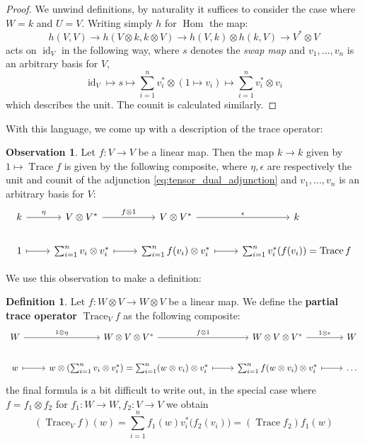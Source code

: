 \documentclass[12pt]{article}
\theoremstyle{plain}
\theoremstyle{definition}
\newtheorem{defn}[thm]{Definition} %
\newtheorem{observation}[thm]{Observation}
\newcommand{\lto}{\longrightarrow}
\begin{document}
\begin{proof}
We unwind definitions, by naturality it suffices to consider the case where $W = k$ and $U = V$. Writing simply $h$ for $\operatorname{Hom}$ the map:
\begin{equation}
h(V,V) \lto h(V \otimes k, k \otimes V) \lto h(V,k) \otimes h(k,V) \lto V^\ast \otimes V
\end{equation}
acts on $\operatorname{id}_V$ in the following way, where $s$ denotes the \emph{swap map} and $v_1,...,v_n$ is an arbitrary basis for $V$,
\begin{equation}
\operatorname{id}_V \longmapsto s \longmapsto \sum_{i = 1}^n v_i^\ast \otimes (1 \mapsto v_i) \longmapsto \sum_{i = 1}^nv_i^\ast \otimes v_i
\end{equation}
which describes the unit. The counit is calculated similarly.
\end{proof}
With this language, we come up with a description of the trace operator:
\begin{observation}
Let $f: V \lto V$ be a linear map. Then the map $k \lto k$ given by $1 \longmapsto \operatorname{Trace}f$ is given by the following composite, where $\eta,\epsilon$ are respectively the unit and counit of the adjunction \eqref{eq:tensor_dual_adjunction} and $v_1,...,v_n$ is an arbitrary basis for $V$:
\begin{equation}
\begin{tikzcd}
k\arrow[r,"{\eta}"] & V \otimes V^\ast\arrow[r, "{f \otimes 1}"] & V \otimes V^\ast\arrow[r,"{\epsilon}"] & k\\
1\arrow[r,mapsto] & \sum_{i = 1}^n v_i \otimes v_i^\ast\arrow[r,mapsto] & \sum_{i = 1}^n f(v_i) \otimes v_i^\ast\arrow[r,mapsto] & \sum_{i = 1}^n v_i^{\ast}(f(v_i)) = \operatorname{Trace}f
\end{tikzcd}
\end{equation}
\end{observation}
We use this observation to make a definition:
\begin{defn}
Let $f: W \otimes V \lto W \otimes V$ be a linear map. We define the \textbf{partial trace operator} $\operatorname{Trace}_Vf$ as the following composite:
\begin{equation}\label{eq:partial_trace}
\begin{tikzcd}
W\arrow[r,"{1 \otimes \eta}"] & W \otimes V \otimes V^\ast\arrow[r,"{f \otimes 1}"] & W \otimes V \otimes V^\ast\arrow[r,"{1 \otimes \epsilon}"] & W\\
w\arrow[r,mapsto] & w \otimes (\sum_{i = 1}^n v_i \otimes v_i^\ast) = \sum_{i = 1}^n(w \otimes v_i) \otimes v_i^\ast\arrow[r,mapsto] & \sum_{i = 1}^n f(w \otimes v_i) \otimes v_i^\ast\arrow[r,mapsto] & \hdots
\end{tikzcd}
\end{equation}
the final formula is a bit difficult to write out, in the special case where $f = f_1 \otimes f_2$ for $f_1: W \lto W, f_2: V \lto V$ we obtain
\begin{equation}
(\operatorname{Trace}_Vf)(w) = \sum_{i = 1}^n f_1(w)v_i^\ast\big(f_2(v_i)\big) = (\operatorname{Trace}f_2)f_1(w)
\end{equation}
\end{defn}
\end{document}
